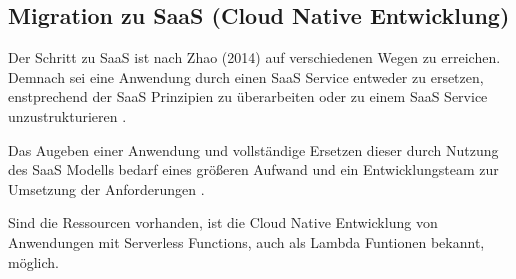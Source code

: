 \subsection{Migration zu SaaS (Cloud Native Entwicklung)}
Der Schritt zu \ac{SaaS} ist nach Zhao (2014) auf verschiedenen Wegen zu erreichen. Demnach sei eine Anwendung durch einen SaaS Service entweder zu ersetzen,
enstprechend der SaaS Prinzipien zu überarbeiten oder zu einem \ac{SaaS} Service unzustrukturieren \cite[Vgl.][S. 144]{Zhao2014}.

Das Augeben einer Anwendung und vollständige Ersetzen dieser durch Nutzung des \ac{SaaS} Modells bedarf eines
größeren Aufwand und ein Entwicklungsteam zur Umsetzung der Anforderungen \cite[Vgl.][]{CIO}.

Sind die Ressourcen vorhanden, ist die Cloud Native Entwicklung von Anwendungen mit Serverless Functions, auch als
Lambda Funtionen bekannt, möglich.